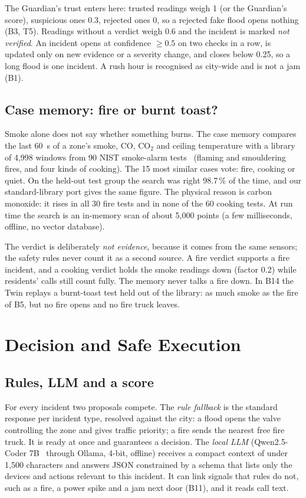 \documentclass[conference]{IEEEtran}
\begin{document}
The Guardian's trust enters here: trusted readings weigh 1 (or the Guardian's score), suspicious ones 0.3, rejected
ones 0, so a rejected fake flood opens nothing (B3, T5). Readings without a verdict weigh 0.6 and the incident is marked
\emph{not verified}. An incident opens at confidence $\ge 0.5$ on two checks in a row, is updated only on new evidence
or a severity change, and closes below 0.25, so a long flood is one incident. A rush hour is recognised as city-wide and is not a jam (B1).

\subsection{Case memory: fire or burnt toast?}
Smoke alone does not say whether something burns. The case memory compares the last 60~s of a zone's smoke, CO,
CO$_2$ and ceiling temperature with a library of 4,998 windows from 90 NIST smoke-alarm tests~\cite{nist} (flaming and
smouldering fires, and four kinds of cooking). The 15 most similar cases vote: fire, cooking or quiet. On the held-out
test group the search was right 98.7\,\% of the time, and our standard-library port gives the same figure. The physical
reason is carbon monoxide: it rises in all 30 fire tests and in none of the 60 cooking tests. At run time the search is
an in-memory scan of about 5,000 points (a few milliseconds, offline, no vector database).

The verdict is deliberately \emph{not evidence}, because it comes from the same sensors; the safety rules never count it
as a second source. A fire verdict supports a fire incident, and a cooking verdict holds the smoke readings down
(factor 0.2) while residents' calls still count fully. The memory never talks a fire down. In B14 the Twin replays a
burnt-toast test held out of the library: as much smoke as the fire of B5, but no fire opens and no fire truck leaves.

\section{Decision and Safe Execution}
\subsection{Rules, LLM and a score}
For every incident two proposals compete. The \emph{rule fallback} is the standard response per incident type, resolved
against the city: a flood opens the valve controlling the zone and gives traffic priority; a fire sends the nearest free fire
truck. It is ready at once and guarantees a decision. The \emph{local LLM} (Qwen2.5-Coder 7B~\cite{qwen} through Ollama, 4-bit,
offline) receives a compact context of under 1,500 characters and answers JSON constrained by a schema that lists only
the devices and actions relevant to this incident. It can link signals that rules do not, such as a fire, a power spike and
a jam next door (B11), and it reads call text.
\end{document}

